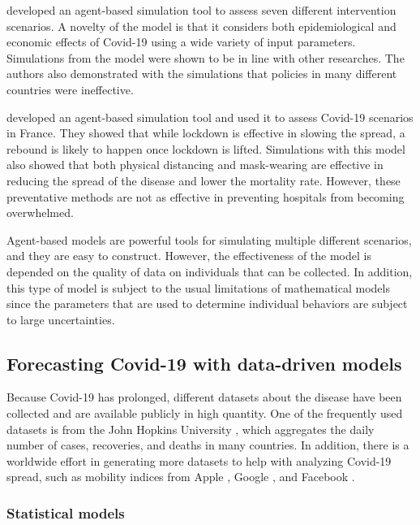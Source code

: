 \citeauthor{silvaCOVIDABSAgentbasedModel2020} \cite{silvaCOVIDABSAgentbasedModel2020} developed an agent-based simulation tool to assess seven different intervention scenarios.
A novelty of the model is that it considers both epidemiological and economic effects of Covid-19 using a wide variety of input parameters.
Simulations from the model were shown to be in line with other researches.
The authors also demonstrated with the simulations that policies in many different countries were ineffective.

\citeauthor{hoertelStochasticAgentbasedModel2020} \cite{hoertelStochasticAgentbasedModel2020} developed an agent-based simulation tool and used it to assess Covid-19 scenarios in France.
They showed that while lockdown is effective in slowing the spread, a rebound is likely to happen once lockdown is lifted.
Simulations with this model also showed that both physical distancing and mask-wearing are effective in reducing the spread of the disease and lower the mortality rate.
However, these preventative methods are not as effective in preventing hospitals from becoming overwhelmed.

Agent-based models are powerful tools for simulating multiple different scenarios, and they are easy to construct.
However, the effectiveness of the model is depended on the quality of data on individuals that can be collected.
In addition, this type of model is subject to the usual limitations of mathematical models since the parameters that are used to determine individual behaviors are subject to large uncertainties.

\subsection{Forecasting Covid-19 with data-driven models}

Because Covid-19 has prolonged, different datasets about the disease have been collected and are available publicly in high quantity.
One of the frequently used datasets is from the John Hopkins University \cite{dongInteractiveWebbasedDashboard2020}, which aggregates the daily number of cases, recoveries, and deaths in many countries.
In addition, there is a worldwide effort in generating more datasets to help with analyzing Covid-19 spread, such as mobility indices from Apple \cite{COVID19Mobility}, Google \cite{COVID19Mobility}, and Facebook \cite{DataGoodTools}.

\subsubsection{Statistical models}

